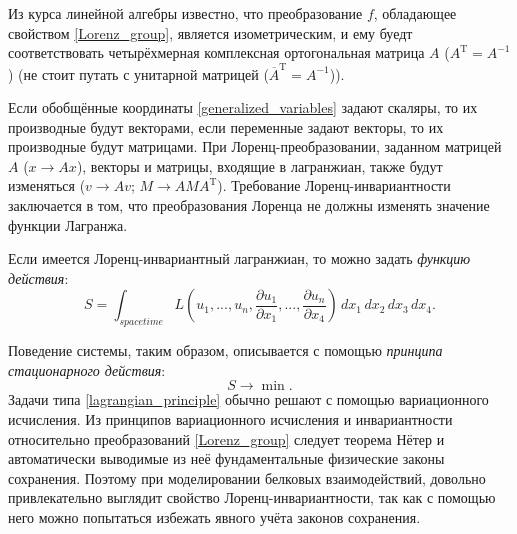 Из курса линейной алгебры известно, что преобразование $f$, обладающее свойством \ref{Lorenz_group}, является изометрическим, и ему буедт соответствовать
четырёхмерная комплексная ортогональная матрица $A$ ($A^\mathrm{T}=A^{-1}$) (не стоит путать с унитарной матрицей ($\overline{A}^\mathrm{T}=A^{-1}$)).

Если обобщённые координаты \ref{generalized_variables} задают скаляры, то их производные будут векторами, если переменные задают векторы, то их производные будут матрицами.
При Лоренц-преобразовании, заданном матрицей $A$ ($x \rightarrow Ax$), векторы и матрицы, входящие в лагранжиан, также будут изменяться
($v \rightarrow Av$; $M \rightarrow AMA^\mathrm{T}$). Требование Лоренц-инвариантности заключается в том, что преобразования Лоренца не должны изменять значение функции Лагранжа.

Если имеется Лоренц-инвариантный лагранжиан, то можно задать \textit{функцию действия}:
\begin{equation}
	S = \int_{spacetime}L(u_1, ..., u_n, \frac{\partial{u_1}}{\partial{x_1}}, ..., \frac{\partial{u_n}}{\partial{x_4}}) \, dx_1 \, dx_2 \, dx_3 \, dx_4.
	\label{action_function}
\end{equation}

Поведение системы, таким образом, описывается с помощью \textit{принципа стационарного действия}:
\begin{equation}
	S \rightarrow \min.
	\label{lagrangian_principle}
\end{equation}
Задачи типа \ref{lagrangian_principle} обычно решают с помощью вариационного исчисления. Из принципов вариационного исчисления и инвариантности относительно преобразований
\ref{Lorenz_group} следует теорема Нётер и автоматически выводимые из неё фундаментальные физические законы сохранения. Поэтому при моделировании белковых взаимодействий,
довольно привлекательно выглядит свойство Лоренц-инвариантности, так как с помощью него можно попытаться избежать явного учёта законов сохранения.

